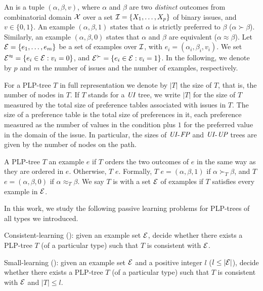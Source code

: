 An  is a tuple $(\alpha, \beta, v)$, where $\alpha$ and 
$\beta$ are two \emph{distinct} outcomes from combinatorial domain 
$\mathcal{X}$ over a set $\mathcal{I}=\{X_1,\ldots,
X_p\}$ of binary issues, and $v \in \{0,1\}$. An example $(\alpha,\beta,1)$
states that $\alpha$ is strictly preferred to $\beta$ ($\alpha \succ \beta$).
Similarly, an example $(\alpha,\beta,0)$ states that $\alpha$ and $\beta$ 
are equivalent ($\alpha\approx\beta$). Let $\mathcal{E}=\{e_1,\ldots,e_m\}$ be a set 
of examples over $\mathcal{I}$, with $e_i=(\alpha_i,\beta_i,v_i)$. We set 
$\mathcal{E}^{\approx}= \{e_i \in \mathcal{E}: v_i=0\}$, and $\mathcal{E}^{\succ}= \{e_i \in \mathcal{E}: 
v_i =1\}$. 
In the following, we denote by $p$ and $m$ the number of issues and the number of
examples, respectively.

For a PLP-tree $T$ in full representation we denote by $|T|$ the size of $T$, that is,
the number of nodes in $T$. If $T$ stands for a $\textit{UI}$ tree, we write $|T|$ for
the size of $T$ measured by the total size of preference tables associated
with issues in $T$. The size of a preference table is the total size of
preferences in it, each preference measured as the number of values in the condition
plus $1$ for the preferred value in the domain of the issue.
In particular, the sizes of $\textit{UI}$-$\textit{FP}$ and $\textit{UI}$-$\textit{UP}$ trees are
given by the number of nodes on the path. 

A PLP-tree $T$  an example $e$ if $T$ orders the two 
outcomes of $e$ in the same way as they are ordered in $e$. Otherwise,
$T$  $e$. Formally, $T$  $e=(\alpha,\beta,1)$
if $\alpha \succ_T \beta$, and $T$  $e=(\alpha,\beta,0)$ if
$\alpha \approx_T \beta$. We say $T$ is  with a set $\mathcal{E}$ 
of examples if $T$ satisfies every example in $\mathcal{E}$.

In this work, we study the following passive learning problems for PLP-trees 
of all types we introduced.
\begin{definition}
Consistent-learning (): given an example set $\mathcal{E}$, decide 
whether there exists a PLP-tree $T$ (of a particular type) such that $T$ 
is consistent with $\mathcal{E}$.
\end{definition}

\begin{definition}
Small-learning (): given an example set $\mathcal{E}$
and a positive integer $l$ ($l \leq |\mathcal{E}|$), decide whether there 
exists a PLP-tree $T$ (of a particular type) such that $T$ is consistent 
with $\mathcal{E}$ and $|T| \leq l$.
\end{definition}

